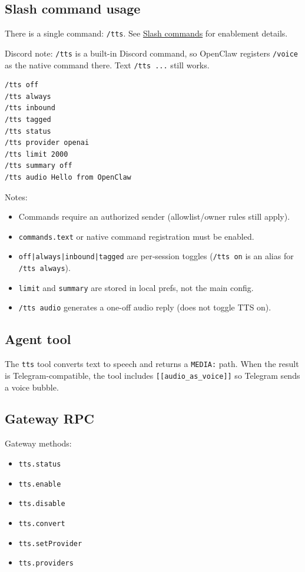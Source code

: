 \subsection{Slash command usage}


There is a single command: \texttt{/tts}.
See \href{/tools/slash-commands}{Slash commands} for enablement details.

Discord note: \texttt{/tts} is a built-in Discord command, so OpenClaw registers
\texttt{/voice} as the native command there. Text \texttt{/tts ...} still works.

\begin{lstlisting}
/tts off
/tts always
/tts inbound
/tts tagged
/tts status
/tts provider openai
/tts limit 2000
/tts summary off
/tts audio Hello from OpenClaw
\end{lstlisting}


Notes:

\begin{itemize}
  \item Commands require an authorized sender (allowlist/owner rules still apply).
  \item \texttt{commands.text} or native command registration must be enabled.
  \item \texttt{off|always|inbound|tagged} are per‑session toggles (\texttt{/tts on} is an alias for \texttt{/tts always}).
  \item \texttt{limit} and \texttt{summary} are stored in local prefs, not the main config.
  \item \texttt{/tts audio} generates a one-off audio reply (does not toggle TTS on).
\end{itemize}


\subsection{Agent tool}


The \texttt{tts} tool converts text to speech and returns a \texttt{MEDIA:} path. When the
result is Telegram-compatible, the tool includes \texttt{[[audio\_as\_voice]]} so
Telegram sends a voice bubble.

\subsection{Gateway RPC}


Gateway methods:

\begin{itemize}
  \item \texttt{tts.status}
  \item \texttt{tts.enable}
  \item \texttt{tts.disable}
  \item \texttt{tts.convert}
  \item \texttt{tts.setProvider}
  \item \texttt{tts.providers}
\end{itemize}



